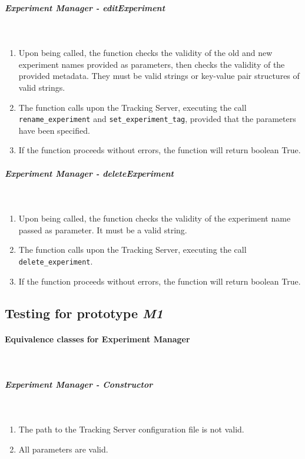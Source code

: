 \subparagraph{Experiment Manager - editExperiment} \mbox{}\\

\begin{enumerate}
    \item Upon being called, the function checks the validity of the old and new experiment names provided as parameters, then checks 
    the validity of the provided metadata. They must be valid strings or key-value pair structures of valid strings.

    \item The function calls upon the Tracking Server, executing the call \texttt{rename\_experiment} and \texttt{set\_experiment\_tag}, provided that 
    the parameters have been specified.

    \item If the function proceeds without errors, the function will return boolean True.
\end{enumerate}

\subparagraph{Experiment Manager - deleteExperiment} \mbox{}\\

\begin{enumerate}
    \item Upon being called, the function checks the validity of the experiment name passed as parameter. It must be a valid string.

    \item The function calls upon the Tracking Server, executing the call \texttt{delete\_experiment}.

    \item If the function proceeds without errors, the function will return boolean True.
\end{enumerate}


\subsection{Testing for prototype \emph{M1}}

\paragraph{Equivalence classes for Experiment Manager} \mbox{}\\

\subparagraph{Experiment Manager - Constructor} \mbox{}\\

\begin{enumerate}
    \item The path to the Tracking Server configuration file is not valid.
    \item All parameters are valid.
\end{enumerate}

